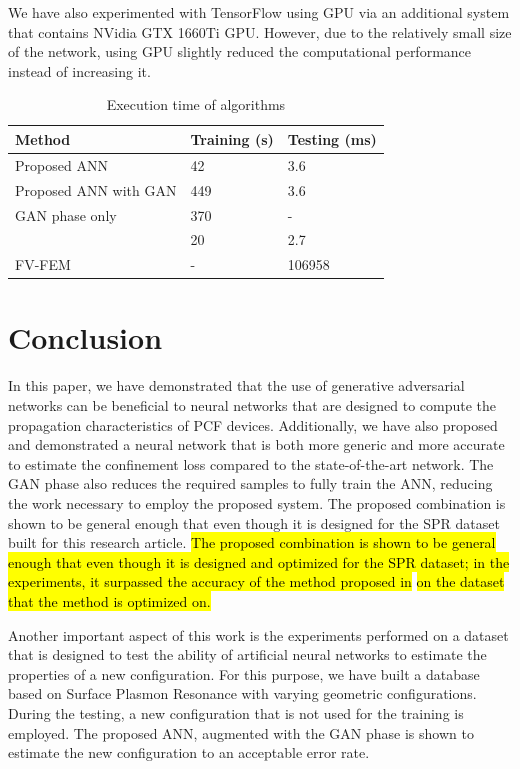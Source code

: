 \documentclass[journal]{IEEEtran}
\begin{document}
We have also experimented with TensorFlow using GPU via an additional system that contains NVidia GTX 1660Ti GPU. However, due to the relatively small size of the network, using GPU slightly reduced the computational performance instead of increasing it.

\begin{table}
	\caption{Execution time of algorithms}
	\centering
	\begin{tabular}{l|l|l}
		Method    			  &  Training (s) & Testing (ms) \\\hline
		Proposed ANN 		  &  42 & 3.6 \\
		Proposed ANN with GAN & 449 & 3.6 \\
		GAN phase only        & 370 &  -  \\
		\cite{paper0}		  &  20 & 2.7 \\
		FV-FEM		   		  &  -  & 106958
	\end{tabular}
	\label{tbl:timing}
\end{table}

\section{Conclusion}
\label{sec:conc}

In this paper, we have demonstrated that the use of generative adversarial networks can be beneficial to neural networks that are designed to compute the propagation characteristics of PCF devices. Additionally, we have also proposed and demonstrated a neural network that is both more generic and more accurate to estimate the confinement loss compared to the state-of-the-art network. The GAN phase also reduces the required samples to fully train the ANN, reducing the work necessary to employ the proposed system. The proposed combination is shown to be general enough that even though it is designed for the SPR dataset built for this research article. \hl{The proposed combination is shown to be general enough that even though it is designed and optimized for the SPR dataset; in the experiments, it surpassed the accuracy of the method proposed in }\cite{paper0}\hl{ on the dataset that the method is optimized on.}

Another important aspect of this work is the experiments performed on a dataset that is designed to test the ability of artificial neural networks to estimate the properties of a new configuration. For this purpose, we have built a database based on Surface Plasmon Resonance with varying geometric configurations. During the testing, a new configuration that is not used for the training is employed. The proposed ANN, augmented with the GAN phase is shown to estimate the new configuration to an acceptable error rate.
\end{document}
